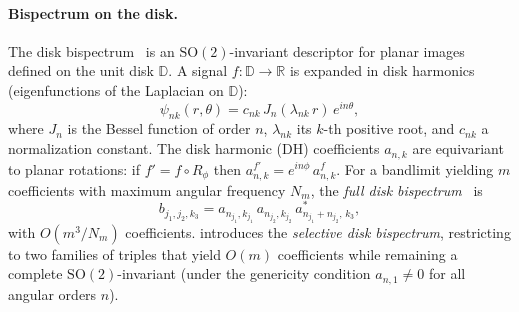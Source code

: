 \documentclass{article}
\theoremstyle{definition}
\theoremstyle{remark}
\newcommand{\R}{\mathbb{R}}
\newcommand{\SO}{\mathrm{SO}}
\theoremstyle{definition}
\begin{document}
\paragraph{Bispectrum on the disk.}
The disk bispectrum~\citep{zhao2014rotationally, myers2025selective}
is an $\SO(2)$-invariant descriptor for planar images defined on the
unit disk $\mathbb{D}$. A signal $f : \mathbb{D} \to \R$ is expanded in
disk harmonics (eigenfunctions of the Laplacian on $\mathbb{D}$):
\begin{equation}\label{eq:disk-harmonics}
  \psi_{nk}(r,\theta) = c_{nk}\, J_n(\lambda_{nk}\, r)\, e^{in\theta},
\end{equation}
where $J_n$ is the Bessel function of order $n$, $\lambda_{nk}$ its
$k$-th positive root, and $c_{nk}$ a normalization constant.
The disk harmonic (DH) coefficients $a_{n,k}$ are equivariant to planar
rotations: if $f' = f \circ R_\phi$ then
$a^{f'}_{n,k} = e^{in\phi}\, a^{f}_{n,k}$.
For a bandlimit yielding $m$ coefficients with maximum angular frequency
$N_m$, the \emph{full disk bispectrum}~\citep{zhao2014rotationally} is
\begin{equation}\label{eq:bispectrum-disk}
  b_{j_1,j_2,k_3}
  = a_{n_{j_1},k_{j_1}}\, a_{n_{j_2},k_{j_2}}\,
    a_{n_{j_1}+n_{j_2},\,k_3}^{*},
\end{equation}
with $O(m^3 / N_m)$ coefficients. \citet{myers2025selective} introduces
the \emph{selective disk bispectrum}, restricting to two families of
triples that yield $O(m)$ coefficients while remaining a complete
$\SO(2)$-invariant (under the genericity condition $a_{n,1}\neq 0$ for
all angular orders $n$).
\end{document}
